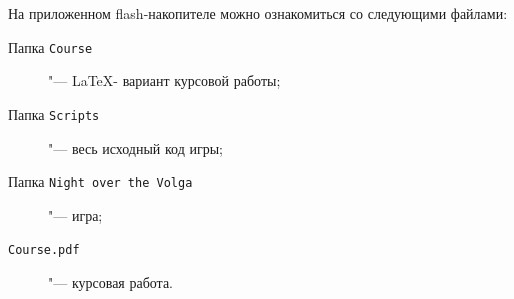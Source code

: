 \documentclass[bachelor, och, coursework, times]{SCWorks}
\begin{document}
    На приложенном flash-накопителе можно ознакомиться со следующими
файлами:

\begin{description}
\item[Папка \texttt{Course}] "---   \LaTeX- вариант курсовой работы;
\item[Папка \texttt{Scripts}] "--- весь исходный код игры;
\item[Папка \texttt{Night over the Volga}] "--- игра;

\item[\texttt{Course.pdf}] "--- курсовая работа.
\end{description}

    
\end{document}
